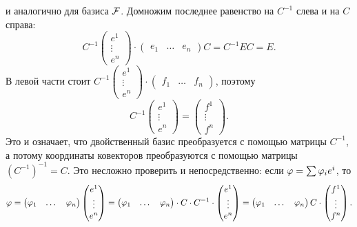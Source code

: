 и аналогично для базиса $\mathcal F$.
Домножим последнее равенство на $C^{-1}$ слева и на $C$ справа:
$$
C^{-1}\begin{pmatrix}e^1\\ \vdots \\ e^n\end{pmatrix}
\cdot
\begin{pmatrix}e_1 & \dots & e_n\end{pmatrix}C =
C^{-1}EC = E.
$$
В левой части стоит
$C^{-1}\begin{pmatrix}e^1\\ \vdots \\ e^n\end{pmatrix}
\cdot
\begin{pmatrix}f_1 & \dots & f_n\end{pmatrix}$,
поэтому
$$
C^{-1}\begin{pmatrix}e^1\\ \vdots \\ e^n\end{pmatrix} = 
\begin{pmatrix}f^1\\ \vdots \\ f^n\end{pmatrix}.
$$
Это и означает, что двойственный базис преобразуется с помощью матрицы
$C^{-1}$, а потому координаты ковекторов преобразуются с помощью
матрицы $(C^{-1})^{-1} = C$. Это несложно проверить и непосредственно:
если $\varphi = \sum \varphi_i e^i$, то
$$
\varphi =
\begin{pmatrix}\varphi_1 & \dots & \varphi_n\end{pmatrix}
\begin{pmatrix}e^1\\\vdots\\ e^n\end{pmatrix} =
\begin{pmatrix}\varphi_1 & \dots & \varphi_n\end{pmatrix}\cdot C\cdot C^{-1}\cdot
\begin{pmatrix}e^1\\\vdots\\ e^n\end{pmatrix} =
\begin{pmatrix}\varphi_1 & \dots & \varphi_n\end{pmatrix}C\cdot
\begin{pmatrix}f^1\\\vdots\\ f^n\end{pmatrix}.
$$


